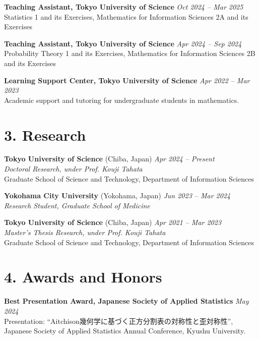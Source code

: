 \documentclass[11pt,a4paper]{article}
\begin{document}
\vspace{0.3em}
\noindent\textbf{Teaching Assistant, Tokyo University of Science} \hfill \textit{Oct 2024 -- Mar 2025}\\
Statistics 1 and its Exercises, Mathematics for Information Sciences 2A and its Exercises

\vspace{0.3em}
\noindent\textbf{Teaching Assistant, Tokyo University of Science} \hfill \textit{Apr 2024 -- Sep 2024}\\
Probability Theory 1 and its Exercises, Mathematics for Information Sciences 2B and its Exercises

\vspace{0.3em}
\noindent\textbf{Learning Support Center, Tokyo University of Science} \hfill \textit{Apr 2022 -- Mar 2023}\\
Academic support and tutoring for undergraduate students in mathematics.

\section*{3. Research}

\noindent\textbf{Tokyo University of Science} (Chiba, Japan) \hfill \textit{Apr 2024 -- Present}\\
\textit{Doctoral Research, under Prof. Kouji Tahata}\\
Graduate School of Science and Technology, Department of Information Sciences

\vspace{0.3em}
\noindent\textbf{Yokohama City University} (Yokohama, Japan) \hfill \textit{Jun 2023 -- Mar 2024}\\
\textit{Research Student, Graduate School of Medicine}

\vspace{0.3em}
\noindent\textbf{Tokyo University of Science} (Chiba, Japan) \hfill \textit{Apr 2021 -- Mar 2023}\\
\textit{Master's Thesis Research, under Prof. Kouji Tahata}\\
Graduate School of Science and Technology, Department of Information Sciences

\section*{4. Awards and Honors}

\noindent\textbf{Best Presentation Award, Japanese Society of Applied Statistics} \hfill \textit{May 2024}\\
Presentation: ``Aitchison幾何学に基づく正方分割表の対称性と歪対称性'', Japanese Society of Applied Statistics Annual Conference, Kyushu University.
\end{document}
